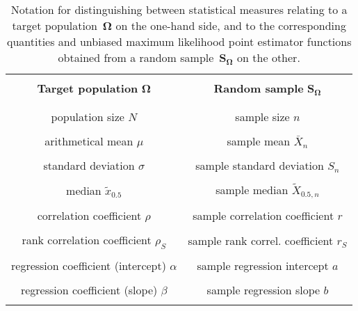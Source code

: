 \begin{table}
\begin{center}
\begin{tabular}[!h]{c|c}
    	\hline \\
      \textbf{Target population} $\boldsymbol{\Omega}$ &
      \textbf{Random sample} $\boldsymbol{S_{\Omega}}$ \\ \\
      \hline \\
      population size $N$ & sample size $n$ \\ \\
      arithmetical mean $\mu$ & sample mean $\bar{X}_{n}$
      \\ \\
      standard deviation $\sigma$ & sample standard deviation
      $S_{n}$ \\ \\
      median $\tilde{x}_{0.5}$ & sample median
      $\tilde{X}_{0.5,n}$ \\ \\
      correlation coefficient $\rho$ & sample correlation
      coefficient $r$ \\ \\
      rank correlation coefficient $\rho_{S}$ & sample rank
      correl. coefficient $r_{S}$ \\ \\
      regression coefficient (intercept) $\alpha$ & sample 
      regression intercept $a$ %
      \\ \\
      regression coefficient (slope) $\beta$ & sample regression 
      slope $b$ %
      \\ \\
      \hline
\end{tabular}
\end{center}
\caption{Notation for distinguishing between statistical 
measures relating to a target population~$\boldsymbol{\Omega}$ on 
the one-hand side, and to the corresponding quantities and 
unbiased maximum likelihood point estimator functions obtained 
from a random sample~$\boldsymbol{S_{\Omega}}$ on the other.}
\end{table}
%

